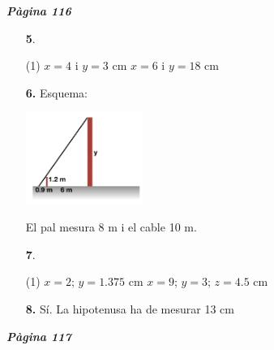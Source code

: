 \documentclass[a4paper, pdf, twoside]{book}
\begin{document}
\begin{multicols}{2}

{\textbf{\em Pàgina 116}} \hrulefill
\begin{enumerate}
\vspace{0.25cm}



 \item[\fontfamily{phv}\selectfont\color{blue}\textbf{5}. ]  \scalebox{0.6}{\simbolclau } 
 \begin{tasks}[column-sep=1em, item-indent=1.3333em](1)
	 \task $x=4$ i $y=3$ cm
	 \task $x=6$ i $y=18$ cm
\end{tasks}
 \end{enumerate}
\begin{enumerate}
\vspace{0.25cm}
\item[\fontfamily{phv}\selectfont\color{blue}\textbf{6. }] 
Esquema:\par \includegraphics [width=0.3\textwidth ]{img-sol/t9-5}\par El pal mesura 8 m i el cable 10 m.
\vspace{0.25cm}



 \item[\fontfamily{phv}\selectfont\color{blue}\textbf{7}. ] 
 \begin{tasks}[column-sep=1em, item-indent=1.3333em](1)
	 \task $x=2$; $y=1.375$ cm
	 \task $x=9$; $y=3$; $z=4.5$ cm
\end{tasks}
\vspace{0.25cm}
\item[\fontfamily{phv}\selectfont\color{blue}\textbf{8. }] 
Sí. La hipotenusa ha de mesurar 13 cm
 \end{enumerate}
\vspace{0.3cm}


{\textbf{\em Pàgina 117}} \hrulefill
\begin{enumerate}
\vspace{0.25cm}




\end{enumerate}
\end{multicols}
\end{document}
